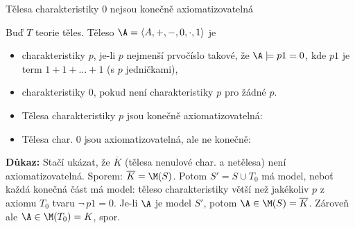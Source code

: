 \documentclass{beamer}
\begin{document}
\begin{frame}{Tělesa charakteristiky 0 nejsou konečně axiomatizovatelná}

    Buď $T$ teorie těles. Těleso $\A=\langle A,+,-,0,\cdot,1 \rangle$ je
    \vspace{-6pt}
    \begin{itemize}
        \item \alert{charakteristiky $p$}, je-li $p$ nejmenší prvočíslo takové, že $\A\models p1=0$, kde $p1$ je term $1+1+\dots+1$ (s $p$ jedničkami),
        \item \alert{charakteristiky 0}, pokud není charakteristiky $p$ pro žádné $p$.
        \item Tělesa charakteristiky $p$ jsou konečně axiomatizovatelná: 
        \item Tělesa char. 0 jsou axiomatizovatelná, ale ne konečně: 
    \end{itemize}
    
    \textbf{Důkaz:}
    Stačí ukázat, že $\overline{K}$ (tělesa nenulové char. a netělesa) není axiomatizovatelná. \alert{Sporem: $\overline{K}=\M(S)$.} Potom  
    $S'=S\cup T_0$ má model, neboť každá konečná část má model: těleso charakteristiky větší než jakékoliv $p$ z axiomu $T_0$ tvaru $\neg\, p1=0$. Je-li $\A$ je model $S'$, potom $\A\in\M(S)=\overline{K}$. Zároveň ale $\A\in\M(T_0)=K$, spor.\hfill\qedsymbol

\end{frame}
\end{document}
